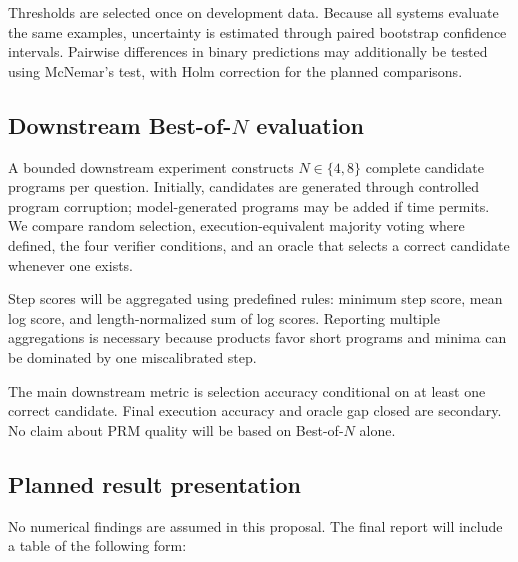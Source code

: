 \documentclass[10pt,twocolumn]{article}
\begin{document}
Thresholds are selected once on development data. Because all systems evaluate the same examples, uncertainty is estimated through paired bootstrap confidence intervals. Pairwise differences in binary predictions may additionally be tested using McNemar's test, with Holm correction for the planned comparisons.

\subsection{Downstream Best-of-\texorpdfstring{$N$}{N} evaluation}
A bounded downstream experiment constructs $N\in\{4,8\}$ complete candidate programs per question. Initially, candidates are generated through controlled program corruption; model-generated programs may be added if time permits. We compare random selection, execution-equivalent majority voting where defined, the four verifier conditions, and an oracle that selects a correct candidate whenever one exists.

Step scores will be aggregated using predefined rules: minimum step score, mean log score, and length-normalized sum of log scores. Reporting multiple aggregations is necessary because products favor short programs and minima can be dominated by one miscalibrated step.

The main downstream metric is selection accuracy conditional on at least one correct candidate. Final execution accuracy and oracle gap closed are secondary. No claim about PRM quality will be based on Best-of-$N$ alone.

\subsection{Planned result presentation}
No numerical findings are assumed in this proposal. The final report will include a table of the following form:

\begin{table}[t]
\centering
\caption{Planned primary results. Values are intentionally blank until experiments are run.}
\label{tab:results-template}
\scriptsize
{}
\end{table}
\end{document}
